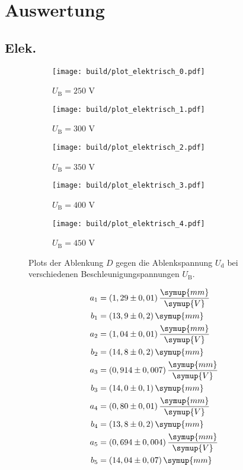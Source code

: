\section{Auswertung}
\label{sec:Auswertung}

\subsection{Elek.}



\begin{figure}
  \centering
  \begin{subfigure}{0.49\textwidth}
    \centering
    \texttt{[image: build/plot\_elektrisch\_0.pdf]}
    \caption{$U_\text{B} = 250$ V}
  \end{subfigure}
  \begin{subfigure}{0.49\textwidth}
    \centering
    \texttt{[image: build/plot\_elektrisch\_1.pdf]}
    \caption{$U_\text{B} = 300$ V}
  \end{subfigure}

  \begin{subfigure}{0.49\textwidth}
    \centering
    \texttt{[image: build/plot\_elektrisch\_2.pdf]}
    \caption{$U_\text{B} = 350$ V}
  \end{subfigure}
  \begin{subfigure}{0.49\textwidth}
    \centering
    \texttt{[image: build/plot\_elektrisch\_3.pdf]}
    \caption{$U_\text{B} = 400$ V}
  \end{subfigure}

  \begin{subfigure}{0.49\textwidth}
    \centering
    \texttt{[image: build/plot\_elektrisch\_4.pdf]}
    \caption{$U_\text{B} = 450$ V}
  \end{subfigure}
  \caption{Plots der Ablenkung $D$ gegen die Ablenkspannung $U_\text{d}$ bei verschiedenen Beschleunigungspannungen $U_\text{B}$.}
  \label{fig:plot-elektrisch}
\end{figure}



\begin{align*}
  a_1 &= (1,29 \pm 0,01) \, \frac{\symup{mm}}{\symup{V}} \\
  b_1 &= (13,9 \pm 0,2) \, \symup{mm} \\
  a_2 &= (1,04 \pm 0,01) \, \frac{\symup{mm}}{\symup{V}} \\
  b_2 &= (14,8 \pm 0,2) \, \symup{mm} \\
  a_3 &= (0,914 \pm 0,007) \, \frac{\symup{mm}}{\symup{V}} \\
  b_3 &= (14,0 \pm 0,1) \, \symup{mm} \\
  a_4 &= (0,80 \pm 0,01) \, \frac{\symup{mm}}{\symup{V}} \\
  b_4 &= (13,8 \pm 0,2) \, \symup{mm} \\
  a_5 &= (0,694 \pm 0,004) \, \frac{\symup{mm}}{\symup{V}} \\
  b_5 &= (14,04 \pm 0,07) \, \symup{mm}
\end{align*}



